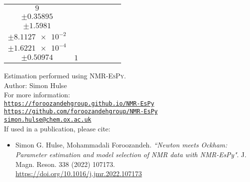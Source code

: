 \documentclass[8pt]{article}
\begin{document}
\begin{longtable}[l]{c c c c c c c}
$\num{9}$ & \begin{tabular}[c]{@{}c@{}}$\num{12.87}$ \\ $\pm\num{0.35895}$\end{tabular} & \begin{tabular}[c]{@{}c@{}}$\num{1.4146e-2}$ \\ $\pm\num{1.5981}$\end{tabular} & \begin{tabular}[c]{@{}c@{}}$\num{2.7664e+3}$ \\ $\pm\num{8.1127e-2}$\end{tabular} & \begin{tabular}[c]{@{}c@{}}$\num{5.5313}$ \\ $\pm\num{1.6221e-4}$\end{tabular} & \begin{tabular}[c]{@{}c@{}}$\num{18.476}$ \\ $\pm\num{0.50974}$\end{tabular} & $\num{1}$\\
\bottomrule
\end{longtable}

\small
\begin{tcolorbox}[hbox]
\begin{varwidth}{12cm}
Estimation performed using \textsc{NMR-EsPy}.\\
Author: Simon Hulse\\
For more information:\\[5pt]
{}\hspace{1em}\href{https://foroozandehgroup.github.io/NMR-EsPy}{\texttt{https://foroozandehgroup.github.io/NMR-EsPy}}\\[5pt]
{}\hspace{1em}\href{https://github.com/foroozandehgroup/NMR-EsPy}{\texttt{https://github.com/foroozandehgroup/NMR-EsPy}}\\[5pt]
{}\hspace{1em}\href{mailto:simon.hulse@chem.ox.ac.uk?subject=NMR-EsPy query}{\texttt{simon.hulse@chem.ox.ac.uk}}\\[5pt]
If used in a publication, please cite:\\
\begin{itemize}[leftmargin=*, nosep, label={}]
\item Simon G. Hulse, Mohammadali Foroozandeh. \textit{``Newton meets Ockham: Parameter estimation and model selection of NMR data with NMR-EsPy"}. J. Magn. Reson. 338 (2022) 107173.\\ \href{https://doi.org/10.1016/j.jmr.2022.107173}{https://doi.org/10.1016/j.jmr.2022.107173}
\end{itemize}
\end{varwidth}
\end{tcolorbox}
\end{document}
